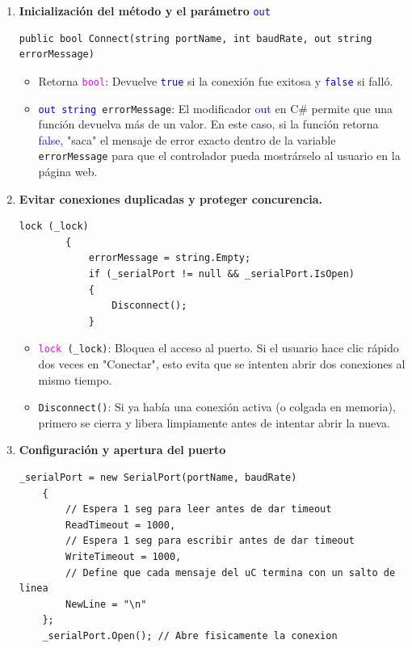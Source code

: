 \documentclass[
10pt, %
a4paper, %
oneside, %
headinclude,footinclude, %
BCOR5mm, %
]{scrartcl}
\begin{document}
\begin{enumerate}
	\item \textbf{Inicialización del método y el parámetro} \texttt{\textcolor{blue}{out}}
	\begin{lstlisting}[style=VSCodeDark]
	public bool Connect(string portName, int baudRate, out string errorMessage)\end{lstlisting}
	\begin{itemize}
		\item Retorna \texttt{\textcolor{Magenta}{bool}}: Devuelve \texttt{\textcolor{blue}{true}} si la conexión fue exitosa y \texttt{\textcolor{blue}{false}} si falló.
		\item \texttt{\textcolor{blue}{out string} errorMessage}: El modificador \textcolor{blue}{out} en C\# permite que una función devuelva más de un valor. En este caso, si la función retorna \textcolor{blue}{false}, "saca" el mensaje de error exacto dentro de la variable \texttt{errorMessage} para que el controlador pueda mostrárselo al usuario en la página web.
	\end{itemize}
	\item \textbf{Evitar conexiones duplicadas y proteger concurencia.}
		\begin{lstlisting}[style=VSCodeDark]
		lock (_lock)
		{
			errorMessage = string.Empty;
			if (_serialPort != null && _serialPort.IsOpen)
			{
				Disconnect();
			}
		\end{lstlisting}
	\begin{itemize}
		\item \texttt{\textcolor{Magenta}{lock} (\_lock)}: Bloquea el acceso al puerto. Si el usuario hace clic rápido dos veces en "Conectar", esto evita que se intenten abrir dos conexiones al mismo tiempo.
		\item \texttt{\textcolor{Dandelion}{Disconnect}()}: Si ya había una conexión activa (o colgada en memoria), primero se cierra y libera limpiamente antes de intentar abrir la nueva.
	\end{itemize}
	\item \textbf{Configuración y apertura del puerto}
	\begin{lstlisting}[style=VSCodeDark]
	_serialPort = new SerialPort(portName, baudRate)
	{
		// Espera 1 seg para leer antes de dar timeout
		ReadTimeout = 1000,
		// Espera 1 seg para escribir antes de dar timeout   
		WriteTimeout = 1000,
		// Define que cada mensaje del uC termina con un salto de linea
		NewLine = "\n"         
	};
	_serialPort.Open(); // Abre fisicamente la conexion
	

\end{lstlisting}
\end{enumerate}
\end{document}
